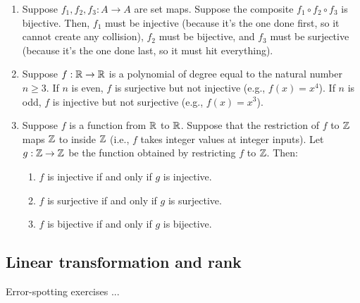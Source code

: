 \documentclass[10pt]{amsart}
\begin{document}
\begin{enumerate}
\item Suppose $f_1,f_2,f_3: A \to A$ are set maps. Suppose the
  composite $f_1 \circ f_2 \circ f_3$ is bijective. Then, $f_1$ must
  be injective (because it's the one done first, so it cannot create
  any collision), $f_2$ must be bijective, and $f_3$ must be
  surjective (because it's the one done last, so it must hit
  everything).
\item Suppose $f:\mathbb{R} \to \mathbb{R}$ is a polynomial of degree equal to the
  natural number $n \ge 3$. If $n$ is even, $f$ is surjective but not
  injective (e.g., $f(x) = x^4$). If $n$ is odd, $f$ is injective but
  not surjective (e.g., $f(x) = x^3$).
\item Suppose $f$ is a function from $\mathbb{R}$ to $\mathbb{R}$. Suppose that the
  restriction of $f$ to $\mathbb{Z}$ maps $\mathbb{Z}$ to inside $\mathbb{Z}$ (i.e., $f$ takes
  integer values at integer inputs). Let $g:\mathbb{Z} \to \mathbb{Z}$ be the function
  obtained by restricting $f$ to $\mathbb{Z}$. Then:

  \begin{enumerate}
  \item $f$ is injective if and only if $g$ is injective.
  \item $f$ is surjective if and only if $g$ is surjective.
  \item $f$ is bijective if and only if $g$ is bijective.
  \end{enumerate}
\end{enumerate}

\subsection{Linear transformation and rank}

Error-spotting exercises ...
\end{document}
